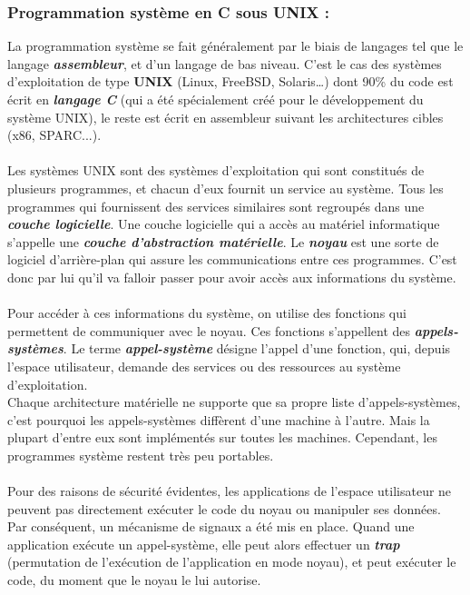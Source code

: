 		\subsubsection*{Programmation système en C sous UNIX :} 
			La programmation système se fait généralement par le biais de langages tel que le langage \textit{\textbf{assembleur}}, et d’un langage de bas niveau. C’est le cas des systèmes d’exploitation de type \textbf{UNIX} (Linux, FreeBSD, Solaris…) dont 90\% du code est écrit en \textit{\textbf{langage C}} (qui a été spécialement créé pour le développement du système UNIX), le reste est écrit en assembleur suivant les architectures cibles (x86, SPARC...).
			
			\paragraph{} Les systèmes UNIX sont des systèmes d'exploitation qui sont constitués de plusieurs programmes, et chacun d'eux fournit un service au système. Tous les programmes qui fournissent des services similaires sont regroupés dans une \textit{\textbf{couche logicielle}}. Une couche logicielle qui a accès au matériel informatique s'appelle une \textit{\textbf{couche d'abstraction matérielle}}. Le \textit{\textbf{noyau}} est une sorte de logiciel d'arrière-plan qui assure les communications entre ces programmes. C'est donc par lui qu'il va falloir passer pour avoir accès aux informations du système.
			
			\paragraph{} Pour accéder à ces informations du système, on utilise des fonctions qui permettent de communiquer avec le noyau. Ces fonctions s'appellent des \textit{\textbf{appels-systèmes}}. Le terme \textit{\textbf{appel-système}} désigne l'appel d'une fonction, qui, depuis l'espace utilisateur, demande des services ou des ressources au système d'exploitation.\\
			Chaque architecture matérielle ne supporte que sa propre liste d'appels-systèmes, c'est pourquoi les appels-systèmes diffèrent d'une machine à l'autre. Mais la plupart d'entre eux sont implémentés sur toutes les machines. Cependant, les programmes système restent très peu portables.

			\paragraph{} Pour des raisons de sécurité évidentes, les applications de l'espace utilisateur ne peuvent pas directement exécuter le code du noyau ou manipuler ses données. Par conséquent, un mécanisme de signaux a été mis en place. Quand une application exécute un appel-système, elle peut alors effectuer un \textit{\textbf{trap}} (permutation de l'exécution de l'application en mode noyau), et peut exécuter le code, du moment que le noyau le lui autorise.
